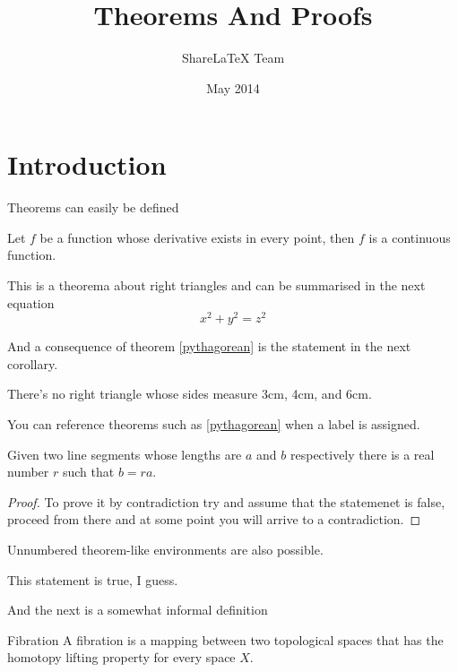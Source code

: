 \documentclass{article}
\title{Theorems And Proofs}
\author{ShareLaTeX Team }
\date{May 2014}
\begin{document}
\maketitle

\section{Introduction}
Theorems can easily be defined

\begin{theorem}
Let $f$ be a function whose derivative exists in every point, then $f$ is a continuous function.
\end{theorem}

\begin{theorem}
\label{pythagorean}
This is a theorema about right triangles and can be summarised in the next equation 
\[ x^2 + y^2 = z^2 \]
\end{theorem}

And a consequence of theorem \ref{pythagorean} is the statement in the next corollary.

\begin{corollary}
There's no right triangle whose sides measure 3cm, 4cm, and 6cm.
\end{corollary}

You can reference theorems such as \ref{pythagorean} when a label is assigned.

\begin{lemma}
Given two line segments whose lengths are $a$ and $b$ respectively there is a real number $r$ such that $b=ra$.
\end{lemma}

\begin{proof}
To prove it by contradiction try and assume that the statemenet is false, proceed from there and at some point you will arrive to a contradiction.
\end{proof}

Unnumbered theorem-like environments are also possible.

\begin{remark}
This statement is true, I guess.
\end{remark}

And the next is a somewhat informal definition

\theoremstyle{definition}
\begin{definition}{Fibration}
A fibration is a mapping between two topological spaces that has the homotopy lifting property for every space $X$.
\end{definition}
\end{document}
